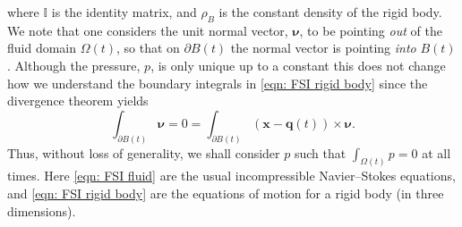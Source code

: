 \documentclass[a4paper]{amsart}
\numberwithin{equation}{section}
\theoremstyle{plain}
\newcommand{\mbf}[1]{\mathbf{#1}}
\newcommand{\mbb}[1]{\mathbb{#1}}
\begin{document}
where $\mbb{I}$ is the identity matrix, and $\rho_B$ is the constant density of the rigid body.
We note that one considers the unit normal vector, $\boldsymbol{\nu}$, to be pointing \emph{out} of the fluid domain $\Omega(t)$, so that on $\partial B(t)$ the normal vector is pointing \emph{into} $B(t)$.
Although the pressure, $p$, is only unique up to a constant this does not change how we understand the boundary integrals in \eqref{eqn: FSI rigid body} since the divergence theorem yields
\[ \int_{\partial B(t)} \boldsymbol{\nu} = 0 = \int_{\partial B(t)} (\mbf{x} - \mbf{q}(t)) \times \boldsymbol{\nu}. \]
Thus, without loss of generality, we shall consider $p$ such that $\int_{\Omega(t)} p = 0$ at all times.
Here \eqref{eqn: FSI fluid} are the usual incompressible Navier--Stokes equations, and \eqref{eqn: FSI rigid body} are the equations of motion for a rigid body (in three dimensions).
\end{document}
